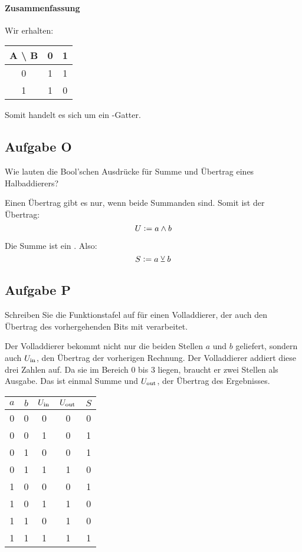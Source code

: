 \paragraph{Zusammenfassung}

Wir erhalten:

\begin{tabular}{c|cc}
	A \textbackslash{} B & 0 & 1 \\
	\hline
	0 & 1 & 1 \\
	1 & 1 & 0
\end{tabular}

Somit handelt es sich um ein \tnand-Gatter.

\FloatBarrier
\subsection{Aufgabe O}

\begin{problem}
	Wie lauten die Bool'schen Ausdrücke für Summe und Übertrag eines
	Halbaddierers?
\end{problem}

Einen Übertrag gibt es nur, wenn beide Summanden \thigh{} sind. Somit ist der
Übertrag:
\[
	U := a \wedge b
\]

Die Summe ist ein \txor. Also:
\[
	S := a \veebar b
\]

\FloatBarrier
\subsection{Aufgabe P}

\begin{problem}
	Schreiben Sie die Funktionstafel auf für einen Volladdierer, der auch den
	Übertrag des vorhergehenden Bits mit verarbeitet.
\end{problem}

Der Volladdierer bekommt nicht nur die beiden Stellen $a$ und $b$ geliefert,
sondern auch $U_\text{in}$, den Übertrag der vorherigen Rechnung. Der Volladdierer
addiert diese drei Zahlen auf. Da sie im Bereich 0 bis 3 liegen, braucht er
zwei Stellen als Ausgabe. Das ist einmal Summe und $U_\text{out}$, der Übertrag des
Ergebnisses.

\begin{tabular}{ccc|cc}
	$a$ & $b$ & $U_\text{in}$ & $U_\text{out}$ & $S$ \\
	\hline
	0 & 0 & 0 & 0 & 0 \\
	0 & 0 & 1 & 0 & 1 \\
	0 & 1 & 0 & 0 & 1 \\
	0 & 1 & 1 & 1 & 0 \\
	1 & 0 & 0 & 0 & 1 \\
	1 & 0 & 1 & 1 & 0 \\
	1 & 1 & 0 & 1 & 0 \\
	1 & 1 & 1 & 1 & 1 \\
\end{tabular}

